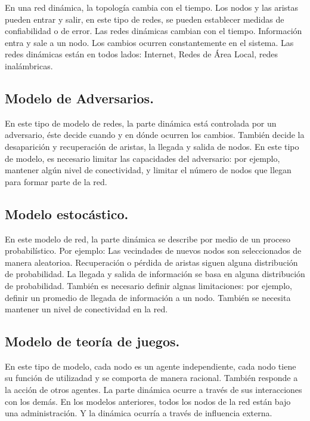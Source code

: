 \documentclass{llncs}
\theoremstyle{plane}
\begin{document}
En una red dinámica, la topología cambia con el tiempo. Los nodos y las aristas pueden entrar y salir, en este tipo de redes, se pueden establecer medidas de confiabilidad o de error. Las redes dinámicas cambian con el tiempo. Información entra y sale a un nodo. Los cambios ocurren constantemente en el sistema. Las redes dinámicas están en todos lados: Internet, Redes de Área Local, redes inalámbricas.

\subsection{Modelo de Adversarios.}

En este tipo de modelo de redes, la parte dinámica está controlada por un adversario, éste decide cuando y en dónde ocurren los cambios. También decide la desaparición y recuperación de aristas, la llegada y salida de nodos. En este tipo de modelo, es necesario limitar las capacidades del adversario: por ejemplo, mantener algún nivel de conectividad, y limitar el número de nodos que llegan para formar parte de la red.

\subsection{Modelo estocástico.}

En este modelo de red, la parte dinámica se describe por medio de un proceso probabilístico.
Por ejemplo:
Las vecindades de nuevos nodos son seleccionados de manera aleatorioa. 
Recuperación o pérdida de aristas siguen alguna distribución de probabilidad.
La llegada y salida de información se basa en alguna distribución de probabilidad. También es necesario definir algnas limitaciones: por ejemplo, definir un promedio de llegada de información a un nodo. También se necesita mantener un nivel de conectividad en la red.

\subsection{Modelo de teoría de juegos.}

En este tipo de modelo, cada nodo es un agente independiente, cada nodo tiene su función de utilizadad y se comporta de manera racional. También responde a la acción de otros agentes. La parte dinámica ocurre a través de sus interacciones con los demás. En los modelos anteriores, todos los nodos de la red están bajo una administración. Y la dinámica ocurría a través de influencia externa.
\end{document}
